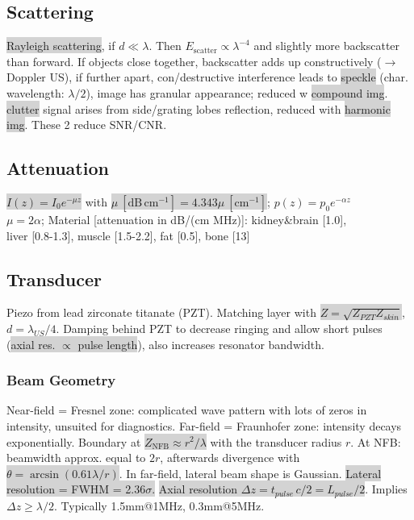 \documentclass[9pt]{article}
\newcommand{\grey}[1]{\setlength{\fboxsep}{0pt}\colorbox{lightgrey}{#1}}
\begin{document}
\begin{multicols}{2}
\subsection{Scattering}
\grey{Rayleigh scattering}, if $d \ll \lambda$. Then $E_\mathrm{scatter} \propto \lambda ^{-4}$ and slightly more backscatter than forward.
If objects close together, backscatter adds up constructively ($\rightarrow$Doppler US), if further apart, con/destructive interference leads to \grey{speckle} (char. wavelength: $\lambda /2$), image has granular appearance; reduced w \grey{compound img}. \grey{clutter} signal arises from side/grating lobes reflection, reduced with \grey{harmonic img}. These 2 reduce SNR/CNR.

\subsection{Attenuation}
\grey{$I(z)=I_0e^{-\mu z}$} with \grey{$\mu \: [\mathrm{dB\,cm^{-1}}] = 4.343 \mu \: [\mathrm{cm^{-1}}]$}; $p(z) = p_0 e^{-\alpha z}$\\
$\mu = 2\alpha$;
Material [attenuation in dB/(cm MHz)]: kidney\&brain [1.0], \\ liver [0.8-1.3], muscle [1.5-2.2], fat [0.5], bone [13]

\subsection{Transducer}
Piezo from lead zirconate titanate (PZT). Matching layer with \grey{$Z = \sqrt{Z_{PZT} Z_{skin}}$}, $d= \lambda _{US} /4$. Damping behind PZT to decrease ringing and allow short pulses (\grey{axial res. $\propto$ pulse length}), also increases resonator bandwidth.

\subsubsection{Beam Geometry}
Near-field = Fresnel zone: complicated wave pattern with lots of zeros in intensity, unsuited for diagnostics. Far-field = Fraunhofer zone: intensity decays exponentially. Boundary at \grey{$Z_\mathrm{NFB} \approx r^2 / \lambda$} with the transducer radius $r$. At NFB: beamwidth approx. equal to $2r$, afterwards divergence with \grey{$\theta = \arcsin(0.61\lambda / r)$}. In far-field, lateral beam shape is Gaussian. \grey{Lateral resolution = FWHM = 2.36$\sigma$.} \grey{Axial resolution $\Delta z = t_{pulse}\,c / 2 = L_{pulse} / 2$}. Implies $\Delta z \ge \lambda/2$. Typically 1.5mm@1MHz, 0.3mm@5MHz.


\end{multicols}
\end{document}
